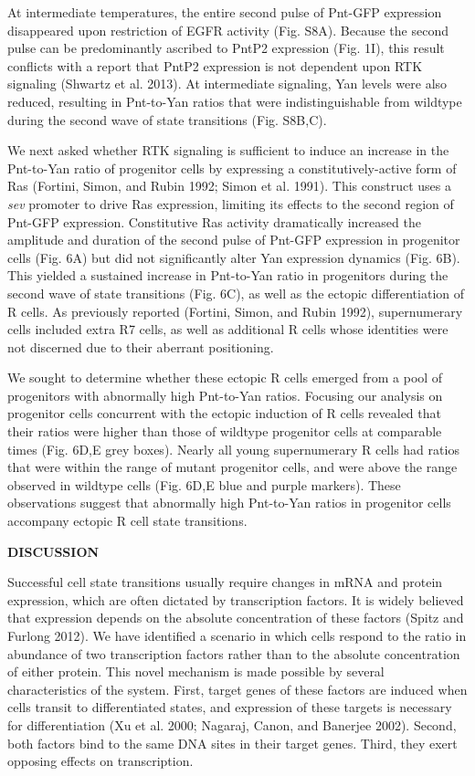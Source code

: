 At intermediate temperatures, the entire second pulse of Pnt-GFP expression disappeared upon restriction of EGFR activity (Fig. S8A). Because the second pulse can be predominantly ascribed to PntP2 expression (Fig. 1I), this result conflicts with a report that PntP2 expression is not dependent upon RTK signaling (Shwartz et al. 2013). At intermediate signaling, Yan levels were also reduced, resulting in Pnt-to-Yan ratios that were indistinguishable from wildtype during the second wave of state transitions (Fig. S8B,C).

We next asked whether RTK signaling is sufficient to induce an increase in the Pnt-to-Yan ratio of progenitor cells by expressing a constitutively-active form of Ras (Fortini, Simon, and Rubin 1992; Simon et al. 1991). This construct uses a \emph{sev} promoter to drive Ras expression, limiting its effects to the second region of Pnt-GFP expression. Constitutive Ras activity dramatically increased the amplitude and duration of the second pulse of Pnt-GFP expression in progenitor cells (Fig. 6A) but did not significantly alter Yan expression dynamics (Fig. 6B). This yielded a sustained increase in Pnt-to-Yan ratio in progenitors during the second wave of state transitions (Fig. 6C), as well as the ectopic differentiation of R cells. As previously reported (Fortini, Simon, and Rubin 1992), supernumerary cells included extra R7 cells, as well as additional R cells whose identities were not discerned due to their aberrant positioning.

We sought to determine whether these ectopic R cells emerged from a pool of progenitors with abnormally high Pnt-to-Yan ratios. Focusing our analysis on progenitor cells concurrent with the ectopic induction of R cells revealed that their ratios were higher than those of wildtype progenitor cells at comparable times (Fig. 6D,E grey boxes). Nearly all young supernumerary R cells had ratios that were within the range of mutant progenitor cells, and were above the range observed in wildtype cells (Fig. 6D,E blue and purple markers). These observations suggest that abnormally high Pnt-to-Yan ratios in progenitor cells accompany ectopic R cell state transitions.

\textbf{DISCUSSION}

Successful cell state transitions usually require changes in mRNA and protein expression, which are often dictated by transcription factors. It is widely believed that expression depends on the absolute concentration of these factors (Spitz and Furlong 2012). We have identified a scenario in which cells respond to the ratio in abundance of two transcription factors rather than to the absolute concentration of either protein. This novel mechanism is made possible by several characteristics of the system. First, target genes of these factors are induced when cells transit to differentiated states, and expression of these targets is necessary for differentiation (Xu et al. 2000; Nagaraj, Canon, and Banerjee 2002). Second, both factors bind to the same DNA sites in their target genes. Third, they exert opposing effects on transcription.

